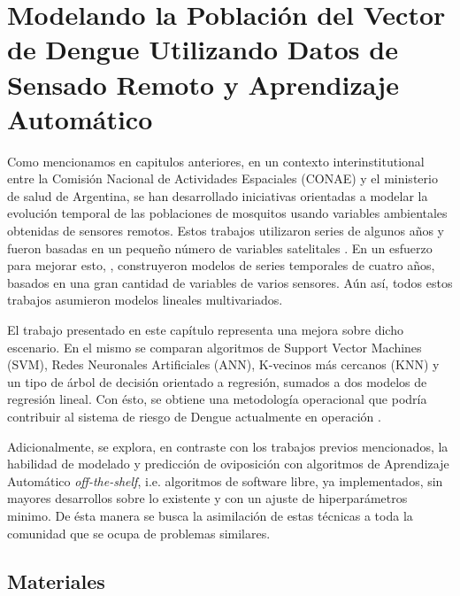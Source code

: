 %
%

\justifying
\chapter{Modelando la Población del Vector de Dengue Utilizando Datos de Sensado Remoto y Aprendizaje Automático}

  \par Como mencionamos en capitulos anteriores, en un contexto interinstitutional entre
    la Comisión Nacional de Actividades Espaciales (CONAE) y el ministerio de salud
    de Argentina, se han desarrollado iniciativas orientadas a modelar la evolución temporal de
    las poblaciones de mosquitos usando variables ambientales obtenidas de
    sensores remotos. Estos trabajos utilizaron series de algunos años y fueron
    basadas en un pequeño número de variables satelitales \cite{ndwi_erffectiveness, modis_data}.
    En un esfuerzo para mejorar esto, \cite{temporal_modeling}, construyeron modelos
    de series temporales de cuatro años, basados en una gran cantidad de variables
    de varios sensores.
    Aún así, todos estos trabajos asumieron modelos lineales multivariados.

  \par El trabajo presentado en este capítulo representa una mejora sobre
    dicho escenario. En el mismo se comparan algoritmos de
    Support Vector Machines (SVM), Redes Neuronales Artificiales (ANN),
    K-vecinos más cercanos (KNN) y un tipo de árbol de decisión orientado a
    regresión, sumados a dos modelos de regresión lineal. Con ésto, se
    obtiene una metodología operacional que podría contribuir al sistema de riesgo
    de Dengue actualmente en operación \cite{porcasi_operative, analisis_cordoba}.

  \par Adicionalmente, se explora, en contraste con los trabajos previos mencionados,
    la habilidad de modelado y predicción de oviposición con algoritmos de Aprendizaje
    Automático \textit{off-the-shelf}, i.e. algoritmos de software libre, ya
    implementados, sin mayores desarrollos sobre lo existente y con un ajuste de
    hiperparámetros minimo. De ésta manera se busca la asimilación de estas
    técnicas a toda la comunidad que se ocupa de problemas similares.


\section{Materiales}

